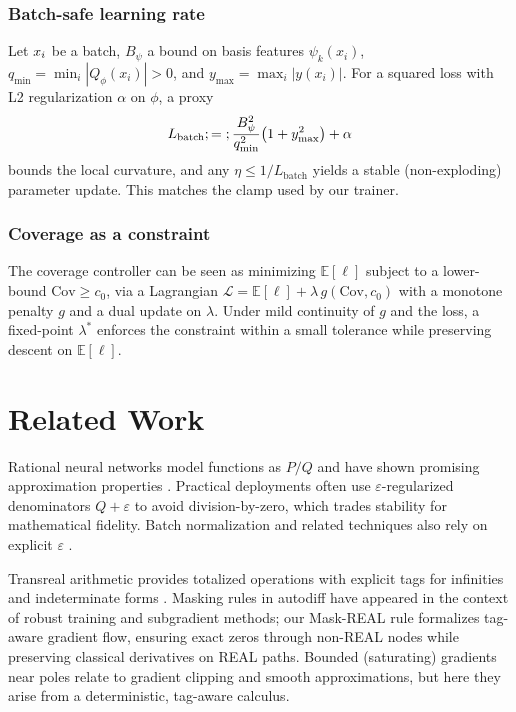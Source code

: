 \documentclass[11pt,twoside]{article}
\begin{document}
\subsubsection{Batch-safe learning rate}

Let $\\{x_i\\}$ be a batch, $B_\psi$ a bound on basis features $\psi_k(x_i)$, $q_{\min}=\min_i |Q_\phi(x_i)|>0$, and $y_{\max}=\max_i |y(x_i)|$. For a squared loss with L2 regularization $\alpha$ on $\phi$, a proxy
\[
L_\mathrm{batch} \\;=\\; \frac{B_\psi^2}{q_{\min}^2}\bigl(1+y_{\max}^2\bigr) + \alpha
\]
bounds the local curvature, and any $\eta\le 1/L_\mathrm{batch}$ yields a stable (non-exploding) parameter update. This matches the clamp used by our trainer.

\subsubsection{Coverage as a constraint}

The coverage controller can be seen as minimizing $\mathbb{E}[\ell]$ subject to a lower-bound $\mathrm{Cov}\ge c_0$, via a Lagrangian $\mathcal{L}=\mathbb{E}[\ell] + \lambda\,g(\mathrm{Cov},c_0)$ with a monotone penalty $g$ and a dual update on $\lambda$. Under mild continuity of $g$ and the loss, a fixed-point $\lambda^*$ enforces the constraint within a small tolerance while preserving descent on $\mathbb{E}[\ell]$.

\section{Related Work}
Rational neural networks model functions as $P/Q$ and have shown promising approximation properties \citep{boulle2020rational}. Practical deployments often use $\varepsilon$-regularized denominators $Q+\varepsilon$ to avoid division-by-zero, which trades stability for mathematical fidelity. Batch normalization and related techniques also rely on explicit $\varepsilon$ \citep{ioffe2015batchnorm}.

Transreal arithmetic provides totalized operations with explicit tags for infinities and indeterminate forms \citep{dosreis2016transreal,anderson2019transmathematics}. Masking rules in autodiff have appeared in the context of robust training and subgradient methods; our Mask-REAL rule formalizes tag-aware gradient flow, ensuring exact zeros through non-REAL nodes while preserving classical derivatives on REAL paths. Bounded (saturating) gradients near poles relate to gradient clipping and smooth approximations, but here they arise from a deterministic, tag-aware calculus.
\end{document}
